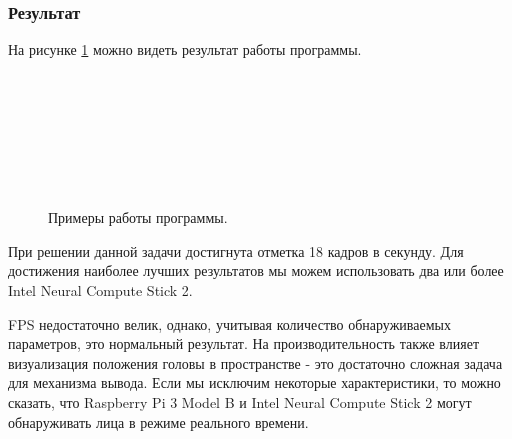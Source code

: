\documentclass[14pt,a4paper]{scrartcl}
\begin{document}
		\subsubsection{Результат}
		
			На рисунке \ref{fig:Face_Detection_Examples} можно видеть результат работы программы.
			
			\begin{figure}[H]
				\begin{minipage}[h]{0.47\linewidth}
					 \hspace{0.1cm} \\
				\end{minipage}
				\hfill
				\begin{minipage}[h]{0.47\linewidth}
					 \hspace{0.1cm} \\
				\end{minipage}
				\vfill
				\begin{minipage}[h]{0.47\linewidth}
					 \\
				\end{minipage}
				\hfill
				\begin{minipage}[h]{0.47\linewidth}
					 \\
				\end{minipage}
				\caption{Примеры работы программы.}
				\label{fig:Face_Detection_Examples}
			\end{figure}
		
			При решении данной задачи достигнута отметка 18 кадров в секунду. Для достижения наиболее лучших результатов мы можем использовать два или более Intel Neural Compute Stick 2. 
			
			FPS недостаточно велик, однако, учитывая количество обнаруживаемых параметров, это нормальный результат. На производительность также влияет визуализация положения головы в пространстве - это достаточно сложная задача для механизма вывода. Если мы исключим некоторые характеристики, то можно сказать, что Raspberry Pi 3 Model B и Intel Neural Compute Stick 2 могут обнаруживать лица в режиме реального времени.
	
\end{document}
